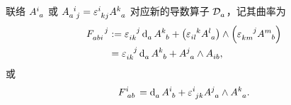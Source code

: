 
		联络 $\tensor{A}{^i_a}$ 或 $\tensor{A}{_a^i_j} = \tensor{\vol}{^i_k_j} \tensor{A}{^k_a}$ 对应新的导数算子 $\AD{a}$，记其曲率为
		\begin{equation}
			\begin{split}
				\tensor{F}{_a_b_i^j} &\definedby \tensor{\vol}{_i_k^j} \tensor{\dd{}}{_a} \tensor{A}{^k_b} + \left( \tensor{\vol}{_i_l^k} \tensor{A}{^l_a} \right) \wedge \left( \tensor{\vol}{_k_m^j} \tensor{A}{^m_b} \right)\\
				&= \tensor{\vol}{_i_k^j} \tensor{\dd{}}{_a} \tensor{A}{^k_b} + \tensor{A}{^j_a} \wedge \tensor{A}{_i_b},
			\end{split}
		\end{equation}
		或
		\begin{equation}
			\tensor{F}{^i_a_b} = \tensor{\dd{}}{_a} \tensor{A}{^i_b} + \tensor{\vol}{^i_j_k} \tensor{A}{^j_a} \wedge \tensor{A}{^k_a}.
		\end{equation}


